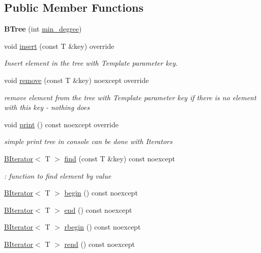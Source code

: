 \subsection*{Public Member Functions}
\begin{DoxyCompactItemize}
\item 
\mbox{\label{classBTree_a16c152bc0c234a02359d259c5dd1d959}} 
{\bfseries B\+Tree} (int \hyperlink{classBTree_a67674b9ddf809c4f518185888f0918e4}{min\+\_\+degree})
\item 
\mbox{\label{classBTree_a6b821651c388e302d1fb43551bb67232}} 
void \hyperlink{classBTree_a6b821651c388e302d1fb43551bb67232}{insert} (const T \&key) override
\begin{DoxyCompactList}\small\item\em Insert element in the tree with Template parameter key. \end{DoxyCompactList}\item 
\mbox{\label{classBTree_aef3581a1c5e11ac1c037d66a27cbcb94}} 
void \hyperlink{classBTree_aef3581a1c5e11ac1c037d66a27cbcb94}{remove} (const T \&key) noexcept override
\begin{DoxyCompactList}\small\item\em remove element from the tree with Template parameter key  if there is no element with this key -\/ nothing does \end{DoxyCompactList}\item 
\mbox{\label{classBTree_a4f31693f9077aad3266b7f13625b9ede}} 
void \hyperlink{classBTree_a4f31693f9077aad3266b7f13625b9ede}{print} () const noexcept override
\begin{DoxyCompactList}\small\item\em simple print tree in console  can be done with Iterators \end{DoxyCompactList}\item 
\hyperlink{classBIterator}{B\+Iterator}$<$ T $>$ \hyperlink{classBTree_ac0fac7271e38a543aff042db79be9c36}{find} (const T \&key) const noexcept
\begin{DoxyCompactList}\small\item\em \+: function to find element by value \end{DoxyCompactList}\item 
\hyperlink{classBIterator}{B\+Iterator}$<$ T $>$ \hyperlink{classBTree_aae48f3719f14f2170641cf204a9d531c}{begin} () const noexcept
\item 
\hyperlink{classBIterator}{B\+Iterator}$<$ T $>$ \hyperlink{classBTree_a3115f4378da1a0fd49e73a5dbecf9822}{end} () const noexcept
\item 
\hyperlink{classBIterator}{B\+Iterator}$<$ T $>$ \hyperlink{classBTree_a3a24bc55b80013d9fcd57d5589aad413}{rbegin} () const noexcept
\item 
\hyperlink{classBIterator}{B\+Iterator}$<$ T $>$ \hyperlink{classBTree_af024f4b5201a49115da494161d4dcbce}{rend} () const noexcept
\end{DoxyCompactItemize}
